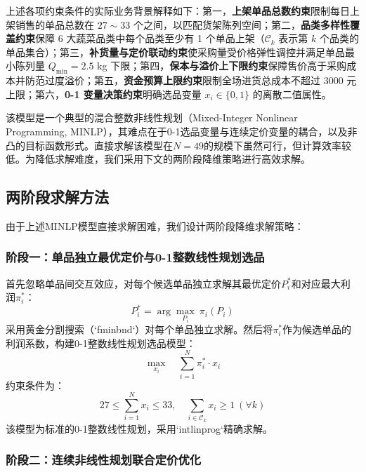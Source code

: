 \documentclass[withoutpreface]{cumcmthesis}
\begin{document}
上述各项约束条件的实际业务背景解释如下：第一，\textbf{上架单品总数约束}限制每日上架销售的单品总数在 $27 \sim 33$ 个之间，以匹配货架陈列空间；第二，\textbf{品类多样性覆盖约束}保障 6 大蔬菜品类中每个品类至少有 1 个单品上架（$\mathcal{C}_k$ 表示第 $k$ 个品类的单品集合）；第三，\textbf{补货量与定价联动约束}使采购量受价格弹性调控并满足单品最小陈列量 $Q_{\min} = 2.5$ kg 下限；第四，\textbf{保本与溢价上下限约束}保障售价高于采购成本并防范过度溢价；第五，\textbf{资金预算上限约束}限制全场进货总成本不超过 3000 元上限；第六，\textbf{0-1 变量决策约束}明确选品变量 $x_i \in \{0,1\}$ 的离散二值属性。

该模型是一个典型的混合整数非线性规划（Mixed-Integer Nonlinear Programming, MINLP），其难点在于0-1选品变量与连续定价变量的耦合，以及非凸的目标函数形式。直接求解该模型在$N=49$的规模下虽然可行，但计算效率较低。为降低求解难度，我们采用下文的两阶段降维策略进行高效求解。

\subsection{两阶段求解方法}

由于上述MINLP模型直接求解困难，我们设计两阶段降维求解策略：

\subsubsection{阶段一：单品独立最优定价与0-1整数线性规划选品}

首先忽略单品间交互效应，对每个候选单品独立求解其最优定价$P_i^*$和对应最大利润$\pi_i^*$：
\begin{equation}
P_i^* = \arg\max_{P_i} \ \pi_i(P_i)
\end{equation}
采用黄金分割搜索（`fminbnd`）对每个单品独立求解。然后将$\pi_i^*$作为候选单品的利润系数，构建0-1整数线性规划选品模型：
\begin{equation}
\max_{x_i} \quad \sum_{i=1}^{N} \pi_i^* \cdot x_i
\end{equation}
约束条件为：
\begin{equation}
27 \leq \sum_{i=1}^{N} x_i \leq 33,\quad \sum_{i \in \mathcal{C}_k} x_i \geq 1\ (\forall k)
\end{equation}
该模型为标准的0-1整数线性规划，采用`intlinprog`精确求解。

\subsubsection{阶段二：连续非线性规划联合定价优化}
\end{document}
